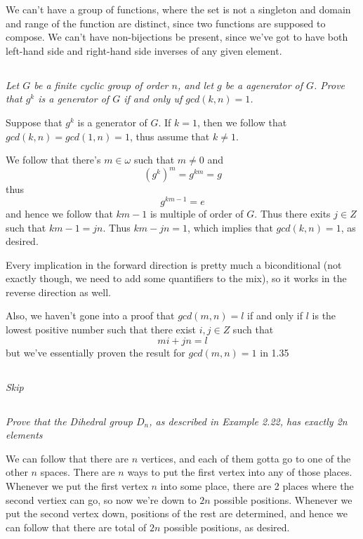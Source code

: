 \documentclass[11pt,oneside,titlepage]{book}
\begin{document}
We can't have a group of functions, where the set is not a singleton and
domain and range of the function are distinct, since two functions are supposed
to compose. We can't have non-bijections be present, since we've got to have
both left-hand side and right-hand side inverses of any given element.

\subsection{}

\textit{Let $G$ be a finite cyclic group of order $n$, and let $g$ be
a agenerator of $G$.  Prove that $g^k$ is a generator of $G$ if and
only uf $gcd(k, n) = 1$.}

Suppose that $g^k$ is a generator of $G$. If $k = 1$,
then we follow that $gcd(k, n) = gcd(1, n) = 1$, thus
assume that $k \neq 1$. 

We follow that there's $m \in \omega$ such that $m \neq 0$
and
$$(g^k)^m = g^{km} = g$$
thus
$$g^{km - 1}  = e$$
and hence we follow that $km - 1$ is multiple of order of $G$.  Thus
there exits $j \in Z$ such that $km - 1 = jn$.  Thus $km - jn = 1$,
which implies that $gcd(k, n) = 1$, as desired.

Every implication in the forward direction is pretty much a
biconditional (not exactly though, we need to add some quantifiers to
the mix), so it works in the reverse direction as well.

Also, we haven't gone into a proof that $gcd(m, n) = l$ if and only if
$l$ is the lowest positive number such that there exist $i, j \in Z$
such that
$$mi + jn = l$$
but we've essentially proven the result for $gcd(m, n) = 1$ in 1.35

\subsection{}

\textit{Skip}

\subsection{}

\textit{Prove that the Dihedral group $D_n$, as described in Example
  2.22, has exactly 2n elements}

We can follow that there are $n$ vertices, and each of them gotta go
to one of the other $n$ spaces. There are $n$ ways to put the first vertex
into any of those places. Whenever we put the first vertex $n$ into some place,
there are 2 places where the second vertiex can go, so now we're down to $2n$
possible positions. Whenever we put the second vertex down, positions of the
rest are determined, and hence we can follow that there are total of $2n$
possible positions, as desired.
\end{document}
